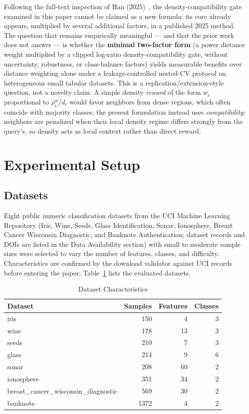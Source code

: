 \documentclass[conference]{IEEEtran}
\begin{document}
Following the full-text inspection of Han (2025)~\cite{dynamicdwknn2025}, the density-compatibility gate examined in this paper cannot be claimed as a new formula: its core already appears, multiplied by several additional factors, in a published 2025 method. The question that remains empirically meaningful --- and that the prior work does not answer --- is whether the \textbf{minimal two-factor form} (a power distance weight multiplied by a clipped log-ratio density-compatibility gate, without uncertainty, robustness, or class-balance factors) yields measurable benefits over distance weighting alone under a leakage-controlled nested-CV protocol on heterogeneous small tabular datasets. This is a replication/extension-style question, not a novelty claim. A simple density \emph{reward} of the form $w_i$ proportional to $\rho_i^{\alpha} / d_i$ would favor neighbors from dense regions, which often coincide with majority classes; the present formulation instead uses \emph{compatibility}: neighbors are penalized when their local density regime differs strongly from the query's, so density acts as local context rather than direct reward.

\section{Experimental Setup}

\subsection{Datasets}

Eight public numeric classification datasets from the UCI Machine Learning Repository (Iris, Wine, Seeds, Glass Identification, Sonar, Ionosphere, Breast Cancer Wisconsin Diagnostic, and Banknote Authentication; dataset records and DOIs are listed in the Data Availability section) with small to moderate sample sizes were selected to vary the number of features, classes, and difficulty. Characteristics are confirmed by the download validator against UCI records before entering the paper; Table~\ref{tab:datasets} lists the evaluated datasets.

\begin{table}[!t]
\centering
\caption{Dataset Characteristics}
\label{tab:datasets}
\footnotesize
\setlength{\tabcolsep}{4pt}
\begin{tabular}{@{}lrrr@{}}
\toprule
Dataset & Samples & Features & Classes \\
\midrule
iris & 150 & 4 & 3 \\
wine & 178 & 13 & 3 \\
seeds & 210 & 7 & 3 \\
glass & 214 & 9 & 6 \\
sonar & 208 & 60 & 2 \\
ionosphere & 351 & 34 & 2 \\
breast\_cancer\_wisconsin\_diagnostic & 569 & 30 & 2 \\
banknote & 1372 & 4 & 2 \\
\bottomrule
\end{tabular}
\end{table}
\end{document}
